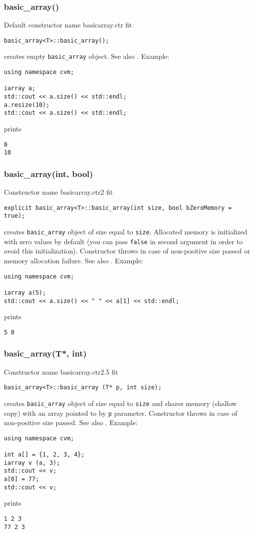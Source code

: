 \subsubsection{basic\_array()}
Default constructor%
\pdfdest name {basicarray.ctr} fit
\begin{verbatim}
basic_array<T>::basic_array();
\end{verbatim}
creates  empty \verb"basic_array" object. See also 
.
Example:
\begin{Verbatim}
using namespace cvm;

iarray a;
std::cout << a.size() << std::endl;
a.resize(10);
std::cout << a.size() << std::endl;
\end{Verbatim}
prints
\begin{Verbatim}
0
10
\end{Verbatim}
\newpage


\subsubsection{basic\_array(int, bool)}
Constructor%
\pdfdest name {basicarray.ctr2} fit
\begin{verbatim}
explicit basic_array<T>::basic_array(int size, bool bZeroMemory = true);
\end{verbatim}
creates  \verb"basic_array" object of size equal to \verb"size".
Allocated memory is initialized with zero values by default 
(you can pass \verb"false" in second argument in order to 
avoid this initialization). 
Constructor throws 
in case of non-positive size passed or memory allocation failure.
See also
.
Example:
\begin{Verbatim}
using namespace cvm;

iarray a(5);
std::cout << a.size() << " " << a[1] << std::endl;
\end{Verbatim}
prints
\begin{Verbatim}
5 0
\end{Verbatim}
\newpage


\subsubsection{basic\_array(T*, int)}
Constructor%
\pdfdest name {basicarray.ctr2.5} fit
\begin{verbatim}
basic_array<T>::basic_array (T* p, int size);
\end{verbatim}
creates  \verb"basic_array" object of size equal to 
\verb"size" and shares memory (shallow copy) with an array pointed to by \verb"p" parameter.
Constructor throws  
in case of non-positive size passed.
See also .
Example:
\begin{Verbatim}
using namespace cvm;

int a[] = {1, 2, 3, 4};
iarray v (a, 3);
std::cout << v;
a[0] = 77;
std::cout << v;
\end{Verbatim}
prints
\begin{Verbatim}
1 2 3
77 2 3
\end{Verbatim}
\newpage


